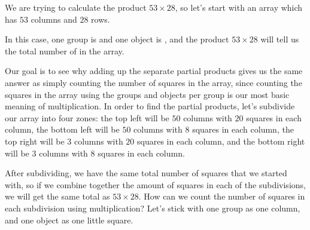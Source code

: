 \documentclass{ximera}
\begin{document}
\begin{explanation}
We are trying to calculate the product $53 \times 28$, so let's start with an array which has $53$ columns and $28$ rows.

\begin{center}
\end{center}
In this case, one group is  and one object is  , and the product $53 \times 28$ will tell us the total number of  in the array.

Our goal is to see why adding up the separate partial products gives us the same answer as simply counting the number of squares in the array, since counting the squares in the array using the groups and objects per group is our most basic meaning of multiplication. In order to find the partial products, let's subdivide our array into four zones: the top left will be $50$ columns with $20$ squares in each column, the bottom left will be $50$ columns with $8$ squares in each column, the top right will be $3$ columns with $20$ squares in each column, and the bottom right will be $3$ columns with $8$ squares in each column.

\begin{center}
\end{center}

After subdividing, we have the same total number of squares that we started with, so if we combine together the amount of squares in each of the subdivisions, we will get the same total as $53 \times 28$. How can we count the number of squares in each subdivision using multiplication? Let's stick with one group as one column, and one object as one little square.


\end{explanation}
\end{document}
